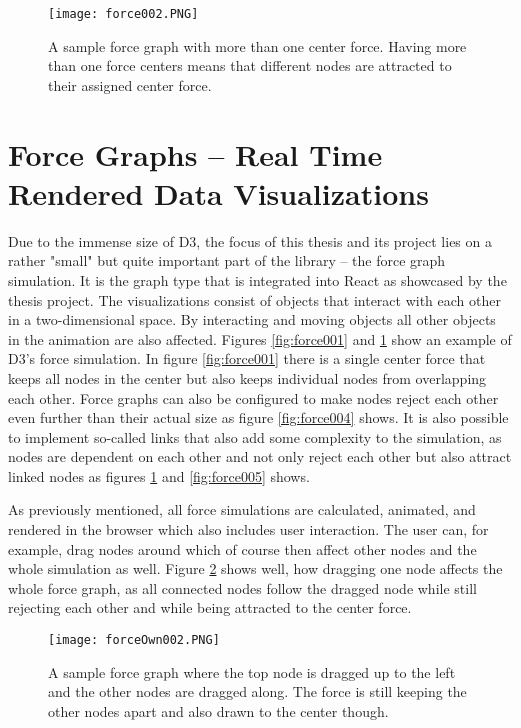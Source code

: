 \begin{figure}
  \centering
  \texttt{[image: force002.PNG]}
  \caption{A sample force graph with more than one center force. Having more than one force centers means that different nodes are attracted to their assigned center force.}
  \label{fig:force002}
\end{figure}

\section{Force Graphs -- Real Time Rendered Data Visualizations}

Due to the immense size of D3, the focus of this thesis and its project lies on a rather "small" but quite important part of the library -- the force graph simulation. It is the graph type that is integrated into React as showcased by the thesis project. The visualizations consist of objects that interact with each other in a two-dimensional space. By interacting and moving objects all other objects in the animation are also affected. Figures \ref{fig:force001} and \ref{fig:force002} show an example of D3's force simulation. In figure \ref{fig:force001} there is a single center force that keeps all nodes in the center but also keeps individual nodes from overlapping each other. Force graphs can also be configured to make nodes reject each other even further than their actual size as figure \ref{fig:force004} shows. It is also possible to implement so-called links that also add some complexity to the simulation, as nodes are dependent on each other and not only reject each other but also attract linked nodes as figures \ref{fig:force002} and \ref{fig:force005} shows.

As previously mentioned, all force simulations are calculated, animated, and rendered in the browser which also includes user interaction. The user can, for example, drag nodes around which of course then affect other nodes and the whole simulation as well. Figure \ref{fig:force003} shows well, how dragging one node affects the whole force graph, as all connected nodes follow the dragged node while still rejecting each other and while being attracted to the center force.

\begin{figure}
  \centering
  \texttt{[image: forceOwn002.PNG]}
  \caption{A sample force graph where the top node is dragged up to the left and the other nodes are dragged along. The force is still keeping the other nodes apart and also drawn to the center though.}
  \label{fig:force003}
\end{figure}

